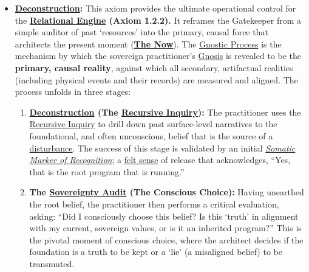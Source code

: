 \documentclass{article}
\begin{document}
\begin{itemize}
    \item \textbf{\hyperlink{gloss:deconstruction}{Deconstruction}:} This axiom provides the ultimate operational control for the \textbf{\hyperlink{gloss:relational_engine}{Relational Engine} (Axiom 1.2.2).} It reframes the Gatekeeper from a simple auditor of past `resources' into the primary, causal force that architects the present moment (\textbf{\hyperlink{gloss:the_now}{The Now}}). The \hyperlink{gloss:gnostic_process}{Gnostic Process} is the mechanism by which the sovereign practitioner's \hyperlink{gloss:gnosis}{Gnosis} is revealed to be the \textbf{primary, causal reality}, against which all secondary, artifactual realities (including physical events and their records) are measured and aligned. The process unfolds in three stages:
    \begin{enumerate}
        \item \textbf{\hyperlink{gloss:deconstruction}{Deconstruction} (The \hyperlink{gloss:recursive_inquiry}{Recursive Inquiry}):} The practitioner uses the \hyperlink{gloss:recursive_inquiry}{Recursive Inquiry} to drill down past surface-level narratives to the foundational, and often unconscious, belief that is the source of a \hyperlink{gloss:disturbance}{disturbance}. The success of this stage is validated by an initial \textit{\hyperlink{gloss:somatic_marker_of_recognition}{Somatic Marker of Recognition}}; a \hyperlink{gloss:felt_sense}{felt sense} of release that acknowledges, ``Yes, that is the root program that is running.''
        
        \item \textbf{The \hyperlink{gloss:sovereignty_audit}{Sovereignty Audit} (The Conscious Choice):} Having unearthed the root belief, the practitioner then performs a critical evaluation, asking: ``Did I consciously choose this belief? Is this `truth' in alignment with my current, sovereign values, or is it an inherited program?'' This is the pivotal moment of conscious choice, where the architect decides if the foundation is a truth to be kept or a `lie' (a misaligned belief) to be transmuted.
        

\end{enumerate}
\end{itemize}
\end{document}
